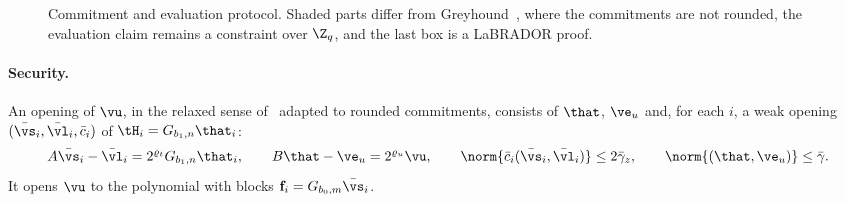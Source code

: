 \begin{figure}[t]
\centering\small
\setlength{\tabcolsep}{0pt}
\renewcommand{\arraystretch}{1.32}
\caption{Commitment and evaluation protocol. Shaded parts differ from Greyhound~\cite[Figures~1 and~4]{NS24}, where the commitments are not rounded, the evaluation claim remains a constraint over $\Z_q$, and the last box is a LaBRADOR proof.}
\label{fig:greyhound}
\end{figure}

\paragraph{Security.}
An opening of $\vu$, in the relaxed sense of~\cite{NS24} adapted to rounded commitments, consists of $\that$, $\ve_u$ and, for each $i$, a weak opening $(\bar\vs_i,\bar\vl_i,\bar c_i)$ of $\tH_i=G_{b_1,n}\that_i$:
\begin{equation}\label{eq:gh-open}
A\bar\vs_i-\bar\vl_i=2^{\varrho_t}G_{b_1,n}\that_i,\qquad B\that-\ve_u=2^{\varrho_u}\vu,\qquad\norm{\bar c_i(\bar\vs_i,\bar\vl_i)}\le2\bar\gamma_z,\qquad\norm{(\that,\ve_u)}\le\bar\gamma .
\end{equation}
It opens $\vu$ to the polynomial with blocks $\mathbf f_i=G_{b_0,m}\bar\vs_i$.

